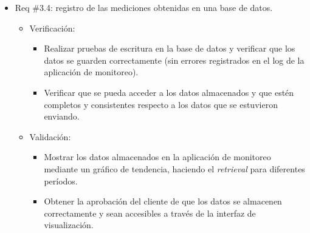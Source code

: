 \documentclass[
11pt, %
]{charter}
\begin{document}
\begin{itemize} 
\item Req \#3.4: registro de las mediciones obtenidas en una base de datos.

\begin{itemize}
	\item Verificación:
            \begin{itemize} 
            \item Realizar pruebas de escritura en la base de datos y verificar que los datos se guarden correctamente (sin errores registrados en el log de la aplicación de monitoreo).
            \item Verificar que se pueda acceder a los datos almacenados y que estén completos y consistentes respecto a los datos que se estuvieron enviando.
            \end{itemize}
	\item Validación: 
            \begin{itemize}
            \item Mostrar los datos almacenados en la aplicación de monitoreo mediante un gráfico de tendencia, haciendo el \textit{retrieval} para diferentes períodos.
            \item Obtener la aprobación del cliente de que los datos se almacenen correctamente y sean accesibles a través de la interfaz de visualización.
            \end{itemize}
\end{itemize}
\end{itemize}
\end{document}

